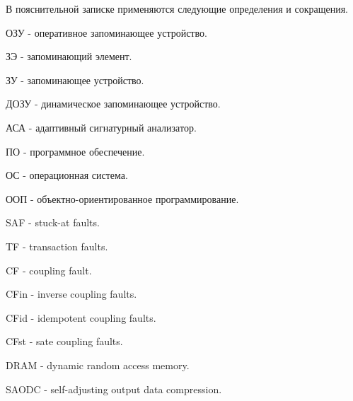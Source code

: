 
В пояснительной записке применяются следующие определения и сокращения.

ОЗУ - оперативное запоминающее устройство.

ЗЭ - запоминающий элемент.

ЗУ - запоминающее устройство.

ДОЗУ - динамическое запоминающее устройство.

АСА - адаптивный сигнатурный анализатор.

ПО - программное обеспечение.

ОС - операционная система.

ООП - объектно-ориентированное программирование.

SAF - stuck-at faults.

TF - transaction faults.

CF - coupling fault.

CFin - inverse coupling faults.

CFid - idempotent coupling faults.

CFst - sate coupling faults.

DRAM - dynamic random access memory.

SAODC - self-adjusting output data compression.


\clearpage
